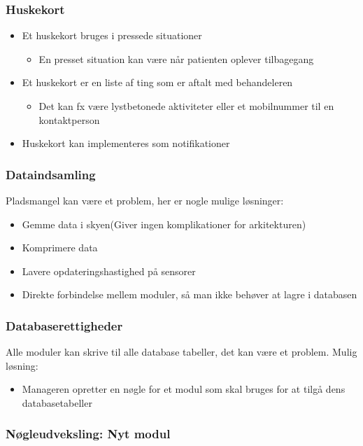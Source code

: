 \begin{frame}
\frametitle{Huskekort}
\begin{itemize}
\item Et huskekort bruges i pressede situationer
\begin{itemize}
	\item En presset situation kan være når patienten oplever tilbagegang
\end{itemize}
\item Et huskekort er en liste af ting som er aftalt med behandeleren
\begin{itemize}
	\item Det kan fx være lystbetonede aktiviteter eller et mobilnummer til en kontaktperson
\end{itemize} 
\item Huskekort kan implementeres som notifikationer
\end{itemize}
\end{frame}

\begin{frame}
\frametitle{Dataindsamling}
Pladsmangel kan være et problem, her er nogle mulige løsninger:
\begin{itemize}
\item Gemme data i skyen(Giver ingen komplikationer for arkitekturen)
\item Komprimere data
\item Lavere opdateringshastighed på sensorer
\item Direkte forbindelse mellem moduler, så man ikke behøver at lagre i databasen
\end{itemize}
\end{frame}

\begin{frame}
\frametitle{Databaserettigheder}
Alle moduler kan skrive til alle database tabeller, det kan være et problem.
Mulig løsning:
\begin{itemize}
\item Manageren opretter en nøgle for et modul som skal bruges for at tilgå dens databasetabeller
\end{itemize}
\end{frame}

\begin{frame}
	\frametitle{Nøgleudveksling: Nyt modul}
\end{frame}

